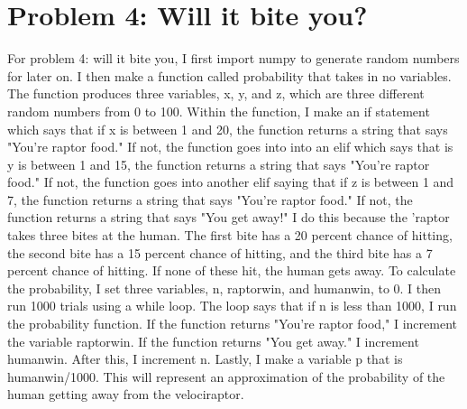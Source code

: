 \documentclass[twocolumn]{revtex4}
\begin{document}
\section{Problem 4: Will it bite you?}
For problem 4: will it bite you, I first import numpy to generate random numbers for later on.  I then make a function called probability that takes in no variables.  The function produces three variables, x, y, and z, which are three different random numbers from 0 to 100.  Within the function, I make an if statement which says that if x is between 1 and 20, the function returns a string that says "You're raptor food."  If not, the function goes into into an elif which says that is y is between 1 and 15, the function returns a string that says "You're raptor food."  If not, the function goes into another elif saying that if z is between 1 and 7, the function returns a string that says "You're raptor food."  If not, the function returns a string that says "You get away!"  I do this because the 'raptor takes three bites at the human.  The first bite has a 20 percent chance of hitting, the second bite has a 15 percent chance of hitting, and the third bite has a 7 percent chance of hitting.  If none of these hit, the human gets away.  To calculate the probability, I set three variables, n, raptorwin, and humanwin, to 0.  I then run 1000 trials using a while loop.  The loop says that if n is less than 1000, I run the probability function.  If the function returns "You're raptor food," I increment the variable raptorwin.  If the function returns "You get away." I increment humanwin.  After this, I increment n.  Lastly, I make a variable p that is humanwin/1000.  This will represent an approximation of the probability of the human getting away from the velociraptor.      
\end{document}
